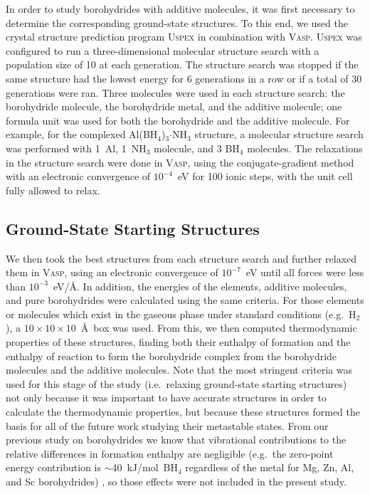 \documentclass[twocolumn, prb, showpacs]{revtex4-1}
\begin{document}
In order to study borohydrides with additive molecules, it was first necessary
to determine the corresponding ground-state structures. To this end, we used the crystal structure
prediction program \textsc{Uspex} \cite{Oganov_2006:crystal_structure,
Oganov_2011:how_evolutionary, Lyakhov_2013:new_developments,
Zhu_2012:constrained_evolutionary} in combination with \textsc{Vasp}.
\textsc{Uspex} was configured to run a three-dimensional
molecular structure search with a population size of 10 at each generation. The
structure search was stopped if the same structure had the lowest energy for 6
generations in a row or if a total of 30 generations were ran. Three molecules
were used in each structure search: the borohydride molecule, the borohydride
metal, and the additive molecule; one formula unit was used for both the
borohydride and the additive molecule. For example, for the
complexed Al(BH$_4$)$_3$$\cdot$NH$_3$ structure, a molecular structure search was performed
with 1~Al, 1~NH$_3$ molecule, and 3 BH$_4$ molecules. The relaxations in the structure search were done
in \textsc{Vasp}, using the conjugate-gradient method with an electronic convergence of $10^{-4}$~eV for 100 ionic
steps, with the unit cell fully allowed to relax.




\subsection{Ground-State Starting Structures}


We then took the best structures from each structure search and further
relaxed them in \textsc{Vasp}, using an electronic
convergence of $10^{-7}$~eV until all forces were less than $10^{-3}$~eV/\AA.
In addition, the energies of the elements, additive molecules, and pure borohydrides were calculated using the
same criteria. For those elements or molecules which exist in the gaseous
phase under standard conditions (e.g.\ H$_2$), a $10\times10\times10$~\AA\ box was used.  From this, we
then computed thermodynamic properties of these structures, finding
both their enthalpy of formation and the enthalpy of reaction to form the
borohydride complex from the borohydride molecules and the additive molecules.
Note that the most stringent criteria was used for this stage of the study
(i.e.\ relaxing ground-state starting structures) not only because it was
important to have accurate structures in order to calculate the thermodynamic
properties, but because these structures formed the basis for all of the
future work studying their metastable states.
From our previous study on borohydrides we know that
vibrational contributions to the relative differences in
formation enthalpy are negligible (e.g.\ the zero-point energy contribution
is $\sim$40~kJ/mol~BH$_4$ regardless of the metal for Mg, Zn, Al, and Sc borohydrides)
\cite{Harrison_2014:tuning_hydrogen,Harrison_2016:suppressing_diborane}, so those effects
were not included in the present study.
\end{document}
